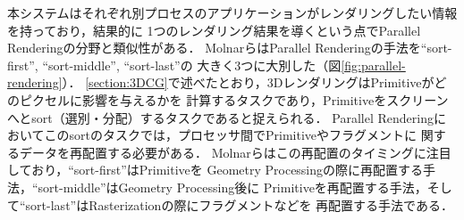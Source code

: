 本システムはそれぞれ別プロセスのアプリケーションがレンダリングしたい情報を持っており，結果的に
1つのレンダリング結果を導くという点でParallel Renderingの分野と類似性がある．
MolnarらはParallel Renderingの手法を``sort-first'', ``sort-middle'', ``sort-last''の
大きく3つに大別した\cite{parallel-rendering}（図\ref{fig:parallel-rendering}）．
\ref{section:3DCG}で述べたとおり，3DレンダリングはPrimitiveがどのピクセルに影響を与えるかを
計算するタスクであり，Primitiveをスクリーンへとsort（選別・分配）するタスクであると捉えられる．
Parallel Renderingにおいてこのsortのタスクでは，プロセッサ間でPrimitiveやフラグメントに
関するデータを再配置する必要がある．
Molnarらはこの再配置のタイミングに注目しており，``sort-first''はPrimitiveを
Geometry Processingの際に再配置する手法，``sort-middle''はGeometry Processing後に
Primitiveを再配置する手法，そして``sort-last''はRasterizationの際にフラグメントなどを
再配置する手法である．

